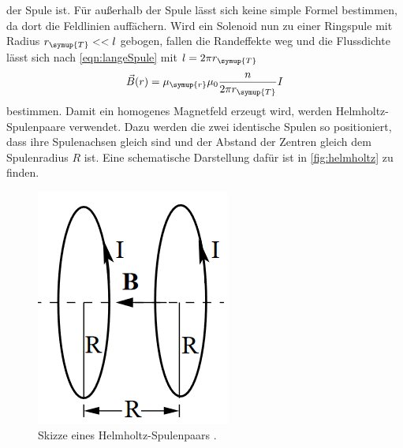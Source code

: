 der Spule ist. Für außerhalb der Spule lässt sich keine simple Formel bestimmen, da dort die Feldlinien
auffächern. Wird ein Solenoid nun zu einer Ringspule mit Radius $r_{\symup{T}} << l$ gebogen, fallen die
Randeffekte weg und die Flussdichte lässt sich nach \autoref{eqn:langeSpule} mit $l = 2\pi r_{\symup{T}}$
\begin{equation}
    \label{eqn:ringspule}
    \vec{B}(r) = \mu_{\symup{r}}\mu_0 \frac{n}{2\pi r_{\symup{T}}} I
\end{equation}
bestimmen. Damit ein homogenes Magnetfeld erzeugt wird, werden Helmholtz-Spulenpaare verwendet. Dazu werden
die zwei identische Spulen so positioniert, dass ihre Spulenachsen gleich sind und der Abstand der Zentren
gleich dem Spulenradius $R$ ist. Eine schematische Darstellung dafür ist in \autoref{fig:helmholtz} zu finden.
\begin{figure}
    \centering
    \includegraphics[scale=0.5]{helmholtzspulenpaar.png}
    \caption{Skizze eines Helmholtz-Spulenpaars \cite{sample}.}
    \label{fig:helmholtz}
\end{figure}

